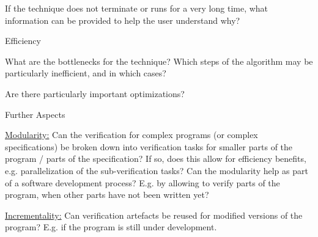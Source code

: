 \documentclass[a4paper]{article}
\begin{document}
\begin{minipage}[t]{0.16\linewidth}
\begin{betterlist}
\begin{betterlist}
			\item If the technique does not terminate or runs for a very long time, what information can be provided to help the user understand why?

		\end{betterlist}
		\item \alert{Efficiency}
		\begin{betterlist}
			\item What are the bottlenecks for the technique? Which steps of the algorithm may be particularly inefficient, and in which cases?

			\item Are there particularly important optimizations?

		\end{betterlist}
		\item \alert{Further Aspects}
		\begin{betterlist}
			\item \underline{Modularity:} Can the verification for complex programs (or complex specifications) be broken down into verification tasks for smaller parts of the program / parts of the specification? If so, does this allow for efficiency benefits, e.g. parallelization of the sub-verification tasks? Can the modularity help as part of a software development process? E.g. by allowing to verify parts of the program, when other parts have not been written yet?

			\framebox[0.90\textwidth][l]{\parbox{0.85\textwidth}{
					\begin{betterlist}
						\item TODO
					\end{betterlist}
				}}
			\item \underline{Incrementality:} Can verification artefacts be reused for modified versions of the program? E.g. if the program is still under development.


\end{betterlist}
\end{betterlist}
\end{minipage}
\end{document}
